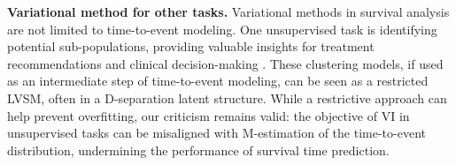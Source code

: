 \textbf{Variational method for other tasks.} Variational methods in survival analysis are not limited to time-to-event modeling. One unsupervised task is identifying potential sub-populations, providing valuable insights for treatment recommendations and clinical decision-making \cite{chapfuwa2020survival,franco2021performance,manduchi2022a,electronics13244866,jiang2024autosurv}. These clustering models, if used as an intermediate step of time-to-event modeling, can be seen as a restricted LVSM, often in a D-separation latent structure. While a restrictive approach can help prevent overfitting, our criticism remains valid: the objective of VI in unsupervised tasks can be misaligned with M-estimation of the time-to-event distribution, undermining the performance of survival time prediction. 
\vspace{-5pt}